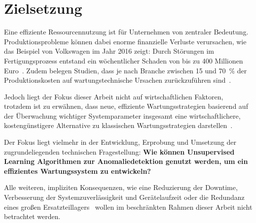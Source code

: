 \chapter{Zielsetzung}
Eine effiziente Ressourcennutzung ist für Unternehmen von zentraler Bedeutung. Produktionsprobleme können dabei enorme finanzielle
Verluste verursachen, wie das Beispiel von Volkswagen im Jahr 2016 zeigt: Durch Störungen im Fertigungsprozess entstand ein wöchentlicher
Schaden von bis zu 400 Millionen Euro~\cite{Krupitzer2020}. Zudem belegen Studien, dass je nach Branche zwischen 15 und 70~\% der
Produktionskosten auf wartungstechnische Ursachen zurückzuführen sind~\cite{You2010}.

Jedoch liegt der Fokus dieser Arbeit nicht auf wirtschaftlichen Faktoren, trotzdem ist zu erwähnen, dass neue, effiziente
Wartungsstrategien basierend auf der Überwachung wichtiger Systemparameter insgesamt eine wirtschaftlichere, kostengünstigere
Alternative zu klassischen Wartungsstrategien %
darstellen~\cite{Deloux2009}.

Der Fokus liegt vielmehr in der Entwicklung, Erprobung und Umsetzung der zugrundeliegenden technischen Fragestellung: \textbf{Wie können
Unsupervised Learning Algorithmen zur Anomaliedetektion genutzt werden, um ein effizientes Wartungssystem zu entwickeln?}

Alle weiteren, impliziten Konsequenzen, wie eine Reduzierung der Downtime, Verbesserung der Systemzuverlässigkeit
und Gerätelaufzeit oder die Redundanz eines großen Ersatzteillagers~\cite{Abdelli2022, Mobley2002, Scheffer2004}
wollen im beschränkten Rahmen dieser Arbeit nicht betrachtet werden.